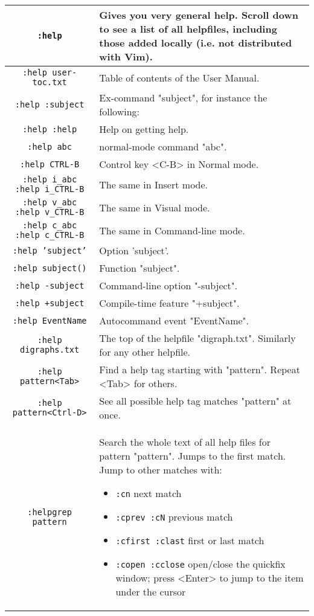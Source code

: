\begin{tabularx}{\textwidth}{|c | X|}
				\hline
				\texttt{:help} & 
				Gives you very general help.
				Scroll down to see a list of all helpfiles, including those added locally (i.e. not distributed with Vim). \\ \hline
				\texttt{:help user-toc.txt} & Table of contents of the User Manual.\\ \hline
				\texttt{:help :subject} & Ex-command "subject", for instance the following:\\ \hline
				\texttt{:help :help} & Help on getting help.\\ \hline
				\texttt{:help abc} & normal-mode command "abc".\\ \hline
				\texttt{:help CTRL-B} & Control key <C-B> in Normal mode.\\ \hline
				\texttt{:help i\_abc}  \texttt{:help i\_CTRL-B} & The same in Insert mode. \\ \hline
				\texttt{:help v\_abc}  \texttt{:help v\_CTRL-B} & The same in Visual mode. \\ \hline
				\texttt{:help c\_abc}  \texttt{:help c\_CTRL-B} & The same in Command-line mode. \\ \hline
				\texttt{:help 'subject'} & Option 'subject'.\\ \hline
				\texttt{:help subject()} & Function "subject".\\ \hline
				\texttt{:help -subject} & Command-line option "-subject".\\ \hline
				\texttt{:help +subject} & Compile-time feature "+subject".\\ \hline
				\texttt{:help EventName} & Autocommand event "EventName".\\ \hline
				\texttt{:help digraphs.txt} & The top of the helpfile "digraph.txt". Similarly for any other helpfile.\\ \hline
				\texttt{:help pattern<Tab>} & Find a help tag starting with "pattern". Repeat <Tab> for others.\\ \hline
				\texttt{:help pattern<Ctrl-D>} & See all possible help tag matches "pattern" at once.\\ \hline
				\texttt{:helpgrep pattern} & Search the whole text of all help files for pattern "pattern".  Jumps to the first match.
				Jump to other matches with:
				\begin{itemize}
								\item \texttt{:cn} next match
								\item \texttt{:cprev :cN} previous match
								\item \texttt{:cfirst :clast} first or last match
								\item \texttt{:copen :cclose} open/close the quickfix window; press <Enter> to jump to the item under the cursor
				\end{itemize}
				\\ \hline
\end{tabularx}
\clearpage
